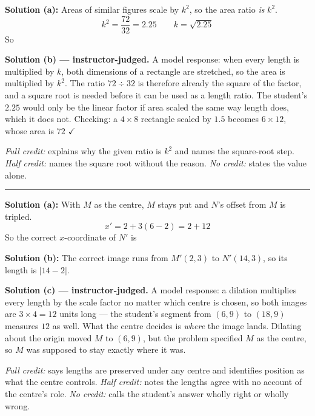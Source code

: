 \documentclass[12pt]{article}
\begin{document}

\textbf{Solution (a):} Areas of similar figures scale by $k^2$, so the area ratio \emph{is} $k^2$.
\[ k^2 = \frac{72}{32} = 2.25 \qquad k = \sqrt{2.25} \]
So 

\textbf{Solution (b) --- instructor-judged.} A model response: when every length is multiplied by $k$, both dimensions of a rectangle are stretched, so the area is multiplied by $k^2$. The ratio $72 \div 32$ is therefore already the square of the factor, and a square root is needed before it can be used as a length ratio. The student's $2.25$ would only be the linear factor if area scaled the same way length does, which it does not. Checking: a $4 \times 8$ rectangle scaled by $1.5$ becomes $6 \times 12$, whose area is $72$ $\checkmark$

\emph{Full credit:} explains why the given ratio is $k^2$ and names the square-root step. \emph{Half credit:} names the square root without the reason. \emph{No credit:} states the value alone.

\vspace{0.2cm}\noindent\rule{\linewidth}{0.2pt}


\textbf{Solution (a):} With $M$ as the centre, $M$ stays put and $N$'s offset from $M$ is tripled.
\[ x' = 2 + 3(6 - 2) = 2 + 12 \]
So the correct $x$-coordinate of $N'$ is 

\textbf{Solution (b):} The correct image runs from $M'(2, 3)$ to $N'(14, 3)$, so its length is $|14 - 2|$. 

\textbf{Solution (c) --- instructor-judged.} A model response: a dilation multiplies every length by the scale factor no matter which centre is chosen, so both images are $3 \times 4 = 12$ units long --- the student's segment from $(6, 9)$ to $(18, 9)$ measures $12$ as well. What the centre decides is \emph{where} the image lands. Dilating about the origin moved $M$ to $(6, 9)$, but the problem specified $M$ as the centre, so $M$ was supposed to stay exactly where it was.

\emph{Full credit:} says lengths are preserved under any centre and identifies position as what the centre controls. \emph{Half credit:} notes the lengths agree with no account of the centre's role. \emph{No credit:} calls the student's answer wholly right or wholly wrong.
\end{document}
